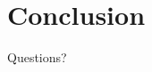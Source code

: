 \documentclass[hyperref={colorlinks=false, breaklinks=true},11pt]{beamer}
\begin{document}
\section{Conclusion}

\begin{frame}

    \centerline{Questions?}

\end{frame}


\end{document}
